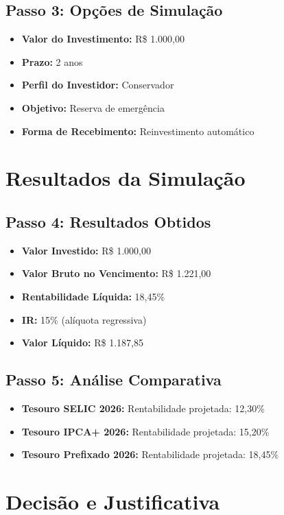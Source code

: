 \documentclass[12pt, a4paper]{article}
\begin{document}
\subsection*{Passo 3: Opções de Simulação}
\begin{itemize}
    \item \textbf{Valor do Investimento:} R\$ 1.000,00
    \item \textbf{Prazo:} 2 anos
    \item \textbf{Perfil do Investidor:} Conservador
    \item \textbf{Objetivo:} Reserva de emergência
    \item \textbf{Forma de Recebimento:} Reinvestimento automático
\end{itemize}

\section{Resultados da Simulação}

\subsection*{Passo 4: Resultados Obtidos}
\begin{itemize}
    \item \textbf{Valor Investido:} R\$ 1.000,00
    \item \textbf{Valor Bruto no Vencimento:} R\$ 1.221,00
    \item \textbf{Rentabilidade Líquida:} 18,45\%
    \item \textbf{IR:} 15\% (alíquota regressiva)
    \item \textbf{Valor Líquido:} R\$ 1.187,85
\end{itemize}

\subsection*{Passo 5: Análise Comparativa}
\begin{itemize}
    \item \textbf{Tesouro SELIC 2026:} Rentabilidade projetada: 12,30\%
    \item \textbf{Tesouro IPCA+ 2026:} Rentabilidade projetada: 15,20\%
    \item \textbf{Tesouro Prefixado 2026:} Rentabilidade projetada: 18,45\%
\end{itemize}

\section{Decisão e Justificativa}
\end{document}
